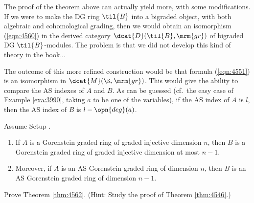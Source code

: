 \begin{rem} \label{rem:4560}
The proof of the theorem above can actually yield more, with some 
modifications. If we were to make the DG ring $\til{B}$ 
into a bigraded object, with both algebraic and cohomological grading, then we 
would obtain an isomorphism (\ref{eqn:4560}) in the derived category 
$\dcat{D}(\til{B}, \mrm{gr})$ of bigraded DG $\til{B}$-modules. 
The problem is that we did not develop this kind of theory in the book...

The outcome of this more refined construction would be that formula 
(\ref{eqn:4551}) is an isomorphism in $\dcat{M}(\K, \mrm{gr})$. 
This would give the ability to compare the AS indexes of $A$ and $B$. As can 
be guessed (cf.\ the easy case of Example \ref{exa:3990}, taking $a$ to be
one of the variables), if the AS index of $A$ is $l$, then the AS index of $B$ 
is $l - \opn{deg}(a)$. 
\end{rem}

\begin{thm} \label{thm:4562}
Assume Setup \tup{\ref{set:4565}}.
\begin{enumerate}
\item If $A$ is a Gorenstein graded ring of graded injective dimension 
$n$, then $B$ is a Gorenstein graded ring of graded injective dimension at most
$n - 1$. 

\item Moreover, if $A$ is an AS Gorenstein graded ring of dimension $n$, 
then $B$ is an AS Gorenstein graded ring of dimension $n - 1$.
\end{enumerate}
\end{thm}

\begin{exer} \label{exer:4560}
Prove Theorem \ref{thm:4562}. (Hint: Study the proof of Theorem 
\ref{thm:4546}.)
\end{exer}

